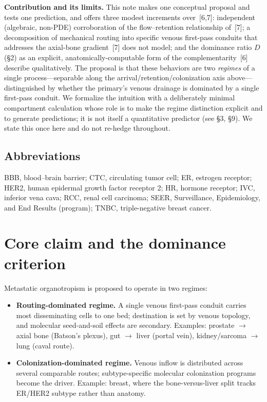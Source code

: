 \documentclass[11pt]{article}
\begin{document}
\textbf{Contribution and its limits.} This note makes one conceptual proposal and
tests one prediction, and offers three modest increments over~[6,7]: independent
(algebraic, non-PDE) corroboration of the flow--retention relationship of~[7]; a
decomposition of mechanical routing into specific venous first-pass conduits that
addresses the axial-bone gradient~[7] does not model; and the dominance ratio $D$
(\S2) as an explicit, anatomically-computable form of the complementarity~[6]
describe qualitatively. The proposal is that these behaviors are two \emph{regimes}
of a single process---separable along the arrival/retention/colonization axis
above---distinguished by whether the primary's venous drainage is dominated by a
single first-pass conduit. We formalize the intuition with a deliberately minimal
compartment calculation whose role is to make the regime distinction explicit and
to generate predictions; it is not itself a quantitative predictor (see
\S3, \S9). We state this once here and do not re-hedge throughout.

\subsection*{Abbreviations}
{\footnotesize
BBB, blood--brain barrier; CTC, circulating tumor cell; ER, estrogen receptor;
HER2, human epidermal growth factor receptor 2; HR, hormone receptor;
IVC, inferior vena cava; RCC, renal cell carcinoma; SEER, Surveillance,
Epidemiology, and End Results (program); TNBC, triple-negative breast cancer.}

\section{Core claim and the dominance criterion}

Metastatic organotropism is proposed to operate in two regimes:

\begin{itemize}[leftmargin=1.4em]
  \item \textbf{Routing-dominated regime.} A single venous first-pass conduit
  carries most disseminating cells to one bed; destination is set by venous
  topology, and molecular seed-and-soil effects are secondary. Examples: prostate
  $\to$ axial bone (Batson's plexus), gut $\to$ liver (portal vein),
  kidney/sarcoma $\to$ lung (caval route).
  \item \textbf{Colonization-dominated regime.} Venous inflow is distributed across
  several comparable routes; subtype-specific molecular colonization programs
  become the driver. Example: breast, where the bone-versus-liver split tracks
  ER/HER2 subtype rather than anatomy.
\end{itemize}
\end{document}

